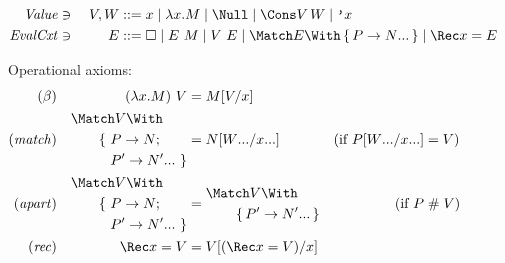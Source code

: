 \begin{figure}
\centering
  
\begin{alignat*}{2}
  \mathit{Value} &\ni{}& V, W
  &::= x
  \mid \lambda x. M
  \mid \Null
  \mid \Cons V \, W
  \mid \q{x}
  \\
  \mathit{EvalCxt} &\ni{}& E
  &::= \hole
  \mid E ~ M
  \mid V ~ E
  \mid \Match E \With \set{\many{P \to N}}
  \mid \Rec x = E
\end{alignat*}

Operational axioms:
\begin{align*}
  (\beta)
  &&
  (\lambda x. M) ~ V
  &=
  M\subst{x}{V}
  \\
  (\mathit{match})
  &&
  \begin{aligned}
    &\Match V \With \\
    &\qquad
    \begin{aligned}[t]
    \{~ &P \to N; \\
    &\many{P' \to N'}~\}
    \end{aligned}
  \end{aligned}
  &=
  N\subst{\many{x}}{\many{W}}
  &(\text{if } P\subst{\many{x}}{\many{W}} &= V)
  \\
  (\mathit{apart})
  &&
  \begin{aligned}
    &\Match V \With \\
    &\qquad
    \begin{aligned}[t]
    \{~ &P \to N; \\
    &\many{P' \to N'}~\}
    \end{aligned}
  \end{aligned}
  &=
  \begin{aligned}
    &\Match V \With \\
    &\qquad \set{\many{P' \to N'}}
  \end{aligned}
  &(\text{if } P &\apart V)
  \\
  (\mathit{rec})
  &&
  \Rec x = V
  &=
  V\subst{x}{(\Rec x = V)}
\end{align*}


\end{figure}
